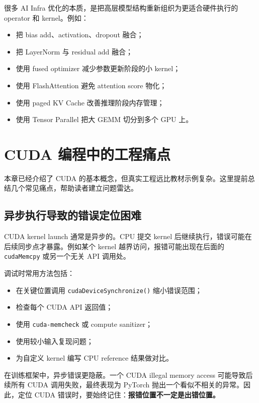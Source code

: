 很多 AI Infra 优化的本质，是把高层模型结构重新组织为更适合硬件执行的 operator 和 kernel。例如：

\begin{itemize}
  \item 把 bias add、activation、dropout 融合；
  \item 把 LayerNorm 与 residual add 融合；
  \item 使用 fused optimizer 减少参数更新阶段的小 kernel；
  \item 使用 FlashAttention 避免 attention score 物化；
  \item 使用 paged KV Cache 改善推理阶段内存管理；
  \item 使用 Tensor Parallel 把大 GEMM 切分到多个 GPU 上。
\end{itemize}

\section{CUDA 编程中的工程痛点}
\label{sec:cuda-engineering-pain-points}

本章已经介绍了 CUDA 的基本概念，但真实工程远比教材示例复杂。这里提前总结几个常见痛点，帮助读者建立问题雷达。

\subsection{异步执行导致的错误定位困难}
\label{subsec:async-debugging}

CUDA kernel launch 通常是异步的。CPU 提交 kernel 后继续执行，错误可能在后续同步点才暴露。例如某个 kernel 越界访问，报错可能出现在后面的 \texttt{cudaMemcpy} 或另一个无关 API 调用处。

调试时常用方法包括：

\begin{itemize}
  \item 在关键位置调用 \texttt{cudaDeviceSynchronize()} 缩小错误范围；
  \item 检查每个 CUDA API 返回值；
  \item 使用 \texttt{cuda-memcheck} 或 compute sanitizer；
  \item 使用较小输入复现问题；
  \item 为自定义 kernel 编写 CPU reference 结果做对比。
\end{itemize}

在训练框架中，异步错误更隐蔽。一个 CUDA illegal memory access 可能导致后续所有 CUDA 调用失败，最终表现为 PyTorch 抛出一个看似不相关的异常。因此，定位 CUDA 错误时，要始终记住：\textbf{报错位置不一定是出错位置。}

